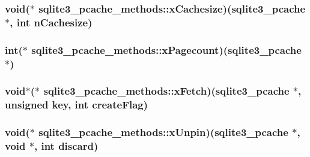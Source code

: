 \hypertarget{structsqlite3__pcache__methods_9cf385dbec7f0d19793e2616a73a3b7f}{
\subsubsection[xCachesize]{\setlength{\rightskip}{0pt plus 5cm}void($\ast$ {\bf sqlite3\_\-pcache\_\-methods::xCachesize})({\bf sqlite3\_\-pcache} $\ast$, int nCachesize)}}
\label{structsqlite3__pcache__methods_9cf385dbec7f0d19793e2616a73a3b7f}


\hypertarget{structsqlite3__pcache__methods_0ab192dc811798e8f17c445dbf379989}{
\subsubsection[xPagecount]{\setlength{\rightskip}{0pt plus 5cm}int($\ast$ {\bf sqlite3\_\-pcache\_\-methods::xPagecount})({\bf sqlite3\_\-pcache} $\ast$)}}
\label{structsqlite3__pcache__methods_0ab192dc811798e8f17c445dbf379989}


\hypertarget{structsqlite3__pcache__methods_9e183d8bc9f625a08fa71734d2477dff}{
\subsubsection[xFetch]{\setlength{\rightskip}{0pt plus 5cm}void$\ast$($\ast$ {\bf sqlite3\_\-pcache\_\-methods::xFetch})({\bf sqlite3\_\-pcache} $\ast$, unsigned key, int createFlag)}}
\label{structsqlite3__pcache__methods_9e183d8bc9f625a08fa71734d2477dff}


\hypertarget{structsqlite3__pcache__methods_de2ab50cc6896be03ee86541877fa85e}{
\subsubsection[xUnpin]{\setlength{\rightskip}{0pt plus 5cm}void($\ast$ {\bf sqlite3\_\-pcache\_\-methods::xUnpin})({\bf sqlite3\_\-pcache} $\ast$, void $\ast$, int discard)}}
\label{structsqlite3__pcache__methods_de2ab50cc6896be03ee86541877fa85e}


